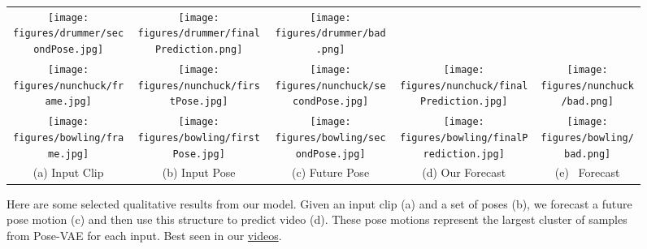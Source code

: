 \begin{figure*}[t!]
\begin{tabular}{ ccccc }
\texttt{[image: figures/drummer/secondPose.jpg]} &
\texttt{[image: figures/drummer/finalPrediction.png]} &
\texttt{[image: figures/drummer/bad.png]}
\\
\texttt{[image: figures/nunchuck/frame.jpg]} &
\texttt{[image: figures/nunchuck/firstPose.jpg]} &
\texttt{[image: figures/nunchuck/secondPose.jpg]} &
\texttt{[image: figures/nunchuck/finalPrediction.jpg]} &
\texttt{[image: figures/nunchuck/bad.png]}
\\
\texttt{[image: figures/bowling/frame.jpg]} &
\texttt{[image: figures/bowling/firstPose.jpg]} &
\texttt{[image: figures/bowling/secondPose.jpg]} &
\texttt{[image: figures/bowling/finalPrediction.jpg]} &
\texttt{[image: figures/bowling/bad.png]}
\\
{(a) Input Clip } & {(b) Input Pose} & {(c) Future Pose} & {(d) Our Forecast} & {(e)~\cite{Vondrick16} Forecast}\\
\end{tabular}  
\vspace{0.1in}
\caption{Here are some selected qualitative results from our model. Given an input clip (a) and a set of poses (b), we forecast a future pose motion (c) and then use this structure to predict video (d). These pose motions represent the largest cluster of samples from Pose-VAE for each input. Best seen in our \href{http://www.cs.cmu.edu/~jcwalker/POS/POS.html}{videos}.}
\label{fig:qualitative}
\vspace{-0.2in}
\end{figure*}

